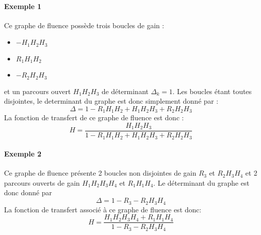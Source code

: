\paragraph{Exemple 1}
\begin{center}
    
\end{center}
Ce graphe de fluence possède trois boucles de gain :
\begin{itemize}
    \item $-H_1H_2H_3$
    \item $R_1H_1H_2$
    \item $-R_2H_2H_3$ 
\end{itemize}
et un parcours ouvert $H_1H_2H_3$ de déterminant $\Delta_k=1$. Les boucles 
étant toutes disjointes, le determinant du graphe est donc simplement 
donné par :
\[
\Delta=1-R_1H_1H_2+H_1H_2H_3+R_2H_2H_3
\]
La fonction de transfert de ce graphe de fluence est donc :
\[
H=\dfrac{H_1H_2H_3}{1-R_1H_1H_2+H_1H_2H_3+R_2H_2H_3}
\]
\paragraph{Exemple 2}
\begin{center}
    
\end{center}
Ce graphe de fluence présente 2 boucles non disjointes de gain $R_3$ 
et $R_2H_3H_4$ et 2 parcours ouverts de gain $H_1H_2H_3H_4$ et $R_1H_1H_4$.
Le déterminant du graphe est donc donné par 
\[
\Delta=1-R_3-R_2H_3H_4
\]
La fonction de transfert associé à ce graphe de fluence est donc:
\[
H=\dfrac{H_1H_2H_3H_4+R_1H_1H_4}{1-R_3-R_2H_3H_4}
\]
